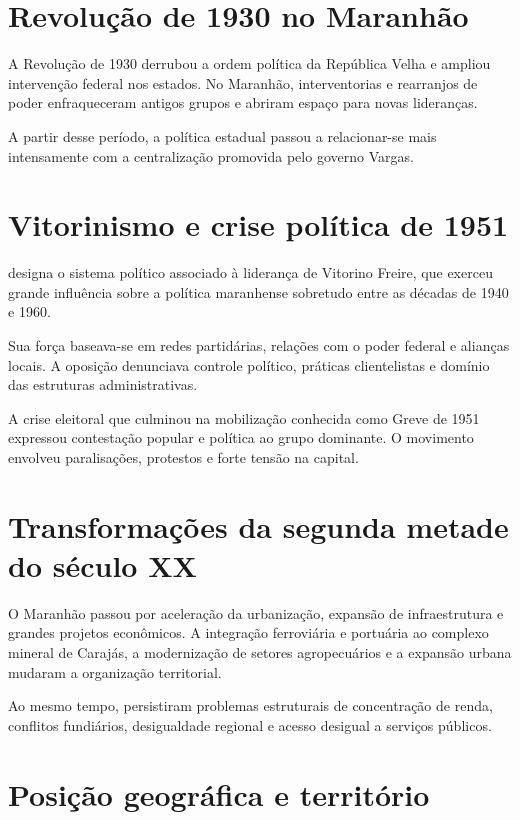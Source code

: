 \section{Revolução de 1930 no Maranhão}

A Revolução de 1930 derrubou a ordem política da República Velha e ampliou intervenção federal nos estados. No Maranhão, interventorias e rearranjos de poder enfraqueceram antigos grupos e abriram espaço para novas lideranças.

A partir desse período, a política estadual passou a relacionar-se mais intensamente com a centralização promovida pelo governo Vargas.

\section{Vitorinismo e crise política de 1951}

 designa o sistema político associado à liderança de Vitorino Freire, que exerceu grande influência sobre a política maranhense sobretudo entre as décadas de 1940 e 1960.

Sua força baseava-se em redes partidárias, relações com o poder federal e alianças locais. A oposição denunciava controle político, práticas clientelistas e domínio das estruturas administrativas.

A crise eleitoral que culminou na mobilização conhecida como Greve de 1951 expressou contestação popular e política ao grupo dominante. O movimento envolveu paralisações, protestos e forte tensão na capital.

\section{Transformações da segunda metade do século XX}

O Maranhão passou por aceleração da urbanização, expansão de infraestrutura e grandes projetos econômicos. A integração ferroviária e portuária ao complexo mineral de Carajás, a modernização de setores agropecuários e a expansão urbana mudaram a organização territorial.

Ao mesmo tempo, persistiram problemas estruturais de concentração de renda, conflitos fundiários, desigualdade regional e acesso desigual a serviços públicos.

\section{Posição geográfica e território}

